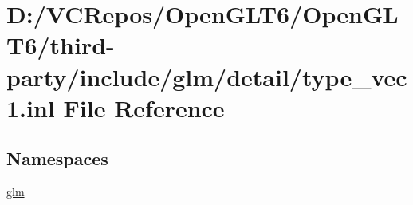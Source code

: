 \hypertarget{type__vec1_8inl}{}\section{D\+:/\+V\+C\+Repos/\+Open\+G\+L\+T6/\+Open\+G\+L\+T6/third-\/party/include/glm/detail/type\+\_\+vec1.inl File Reference}
\label{type__vec1_8inl}
\subsection*{Namespaces}
\begin{DoxyCompactItemize}
\item 
 \mbox{\hyperlink{namespaceglm}{glm}}
\end{DoxyCompactItemize}

